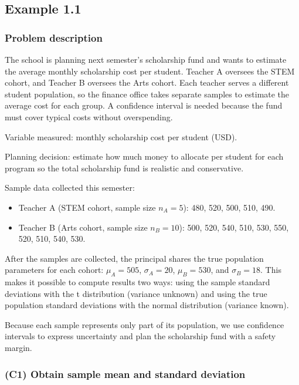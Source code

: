 \subsection{Example 1.1}\label{sec:interval-example1-1}

\subsubsection{Problem description}\label{subsec:interval-example1-1-problem}

The school is planning next semester's scholarship fund and wants to estimate the average monthly scholarship cost per student. Teacher A oversees the STEM cohort, and Teacher B oversees the Arts cohort. Each teacher serves a different student population, so the finance office takes separate samples to estimate the average cost for each group. A confidence interval is needed because the fund must cover typical costs without overspending.

Variable measured: monthly scholarship cost per student (USD).

Planning decision: estimate how much money to allocate per student for each program so the total scholarship fund is realistic and conservative.

Sample data collected this semester:

\begin{itemize}
	\item Teacher A (STEM cohort, sample size \(n_A = 5\)): 480, 520, 500, 510, 490.
	\item Teacher B (Arts cohort, sample size \(n_B = 10\)): 500, 520, 540, 510, 530, 550, 520, 510, 540, 530.
\end{itemize}

After the samples are collected, the principal shares the true population parameters for each cohort: \(\mu_A = 505\), \(\sigma_A = 20\), \(\mu_B = 530\), and \(\sigma_B = 18\). This makes it possible to compute results two ways: using the sample standard deviations with the t distribution (variance unknown) and using the true population standard deviations with the normal distribution (variance known).

Because each sample represents only part of its population, we use confidence intervals to express uncertainty and plan the scholarship fund with a safety margin.


\subsubsection{(C1) Obtain sample mean and standard deviation}\label{subsubsec:interval-example1-1-c1}

